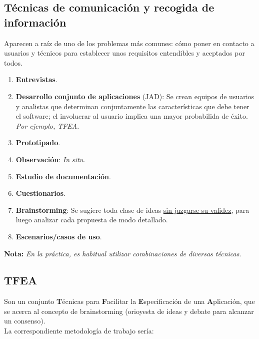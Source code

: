\subsection{Técnicas de comunicación y recogida de información}

Aparecen a raíz de uno de los problemas más comunes: cómo poner en contacto a usuarios y técnicos para establecer unos requisitos entendibles y aceptados por todos.

\begin{enumerate} %
    \item \textbf{Entrevistas}.
    \item \textbf{Desarrollo conjunto de aplicaciones} (JAD): Se crean equipos de usuarios y analistas que determinan conjuntamente las características que debe tener el software; el involucrar al usuario implica una mayor probabilida de éxito. \textit{Por ejemplo, TFEA}.
    \item \textbf{Prototipado}.
    \item \textbf{Observación}: \textit{In situ}.
    \item \textbf{Estudio de documentación}.
    \item \textbf{Cuestionarios}.
    \item \textbf{Brainstorming}: Se sugiere toda clase de ideas \uline{sin juzgarse su validez}, para luego analizar cada propuesta de modo detallado.
    \item \textbf{Escenarios/casos de uso}.
\end{enumerate}

\textbf{Nota:} \textit{En la práctica, es habitual utilizar combinaciones de diversas técnicas}.

\subsection{TFEA}

Son un conjunto \textbf{T}écnicas para \textbf{F}acilitar la \textbf{E}specificación de una \textbf{A}plicación, que se acerca al concepto de brainstorming (orioyesta de ideas y debate para alcanzar un consenso).\\

La correspondiente metodología de trabajo sería:

